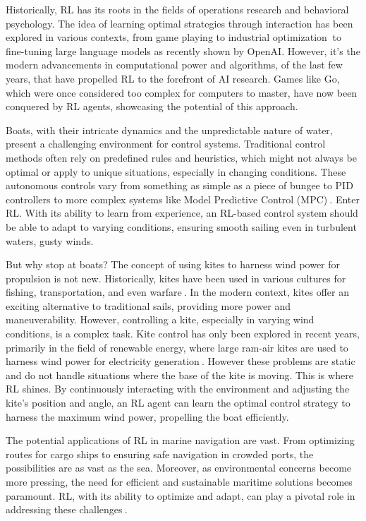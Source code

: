 Historically, RL has its roots in the fields of operations research and behavioral psychology. The idea of learning optimal strategies through interaction has been explored in various contexts, from game playing to industrial optimization$~$\cite{bellman1957dynamic} to fine-tuning large language models as recently shown by OpenAI. However, it's the modern advancements in computational power and algorithms, of the last few years, that have propelled RL to the forefront of AI research. Games like Go, which were once considered too complex for computers to master, have now been conquered by RL agents, showcasing the potential of this approach\cite{silver2016mastering}.

Boats, with their intricate dynamics and the unpredictable nature of water, present a challenging environment for control systems. Traditional control methods often rely on predefined rules and heuristics, which might not always be optimal or apply to unique situations, especially in changing conditions. These autonomous controls vary from something as simple as a piece of bungee to PID controllers to more complex systems like Model Predictive Control (MPC)$~$\cite{erhard2013control}. Enter RL. With its ability to learn from experience, an RL-based control system should be able to adapt to varying conditions, ensuring smooth sailing even in turbulent waters, gusty winds.

But why stop at boats? The concept of using kites to harness wind power for propulsion is not new. Historically, kites have been used in various cultures for fishing, transportation, and even warfare$~$\cite{hallion2003taking}. In the modern context, kites offer an exciting alternative to traditional sails, providing more power and maneuverability. However, controlling a kite, especially in varying wind conditions, is a complex task.  Kite control has only been explored in recent years, primarily in the field of renewable energy, where large ram-air kites are used to harness wind power for electricity generation$~$\cite{kitecontrol}. However these problems are static and do not handle situations where the base of the kite is moving. This is where RL shines. By continuously interacting with the environment and adjusting the kite's position and angle, an RL agent can learn the optimal control strategy to harness the maximum wind power, propelling the boat efficiently.

The potential applications of RL in marine navigation are vast. From optimizing routes for cargo ships to ensuring safe navigation in crowded ports, the possibilities are as vast as the sea. Moreover, as environmental concerns become more pressing, the need for efficient and sustainable maritime solutions becomes paramount. RL, with its ability to optimize and adapt, can play a pivotal role in addressing these challenges$~$\cite{christiansen2013ship}.

